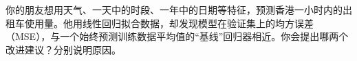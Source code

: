 你的朋友想用天气、一天中的时段、一年中的日期等特征，预测香港一小时内的出租车使用量。他用线性回归拟合数据，却发现模型在验证集上的均方误差（MSE），与一个始终预测训练数据平均值的“基线”回归器相近。你会提出哪两个改进建议？分别说明原因。

